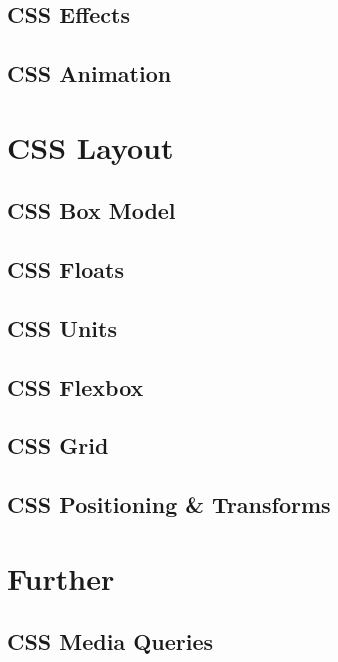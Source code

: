 \documentclass[b5paper,openany]{book}
\begin{document}
\section{CSS Effects}
%

\section{CSS Animation}
%


\chapter{CSS Layout}

\section{CSS Box Model}
%

\section{CSS Floats}
%

\section{CSS Units}


\section{CSS Flexbox}
%

\section{CSS Grid}
%

\section{CSS Positioning \& Transforms}
%


\chapter{Further}

\section{CSS Media Queries}
%
\end{document}
